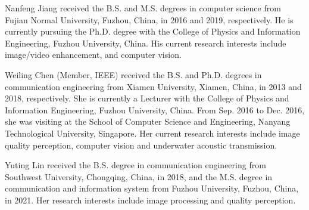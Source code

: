 \documentclass[journal]{IEEEtran}
\begin{document}
\begin{IEEEbiography}{Nanfeng Jiang} received the B.S. and M.S. degrees in computer science from Fujian Normal University, Fuzhou, China, in 2016 and 2019, respectively. He is currently pursuing the Ph.D. degree with the College of Physics and Information Engineering, Fuzhou University, China. His current research interests include image/video enhancement, and computer vision.
\end{IEEEbiography}
\vspace{-2 mm} 
\begin{IEEEbiography}{Weiling Chen} (Member, IEEE) received the B.S. and Ph.D. degrees in communication engineering from Xiamen University, Xiamen, China, in 2013 and 2018, respectively. She is currently a Lecturer with the College of Physics and Information Engineering, Fuzhou University, China. From Sep. 2016 to Dec. 2016, she was visiting at the School of Computer Science and Engineering, Nanyang Technological University, Singapore. Her current research interests include image quality perception, computer vision and underwater acoustic transmission.
\end{IEEEbiography}
\vspace{-2 mm} 
\begin{IEEEbiography}{Yuting Lin} received the B.S. degree in communication engineering from Southwest University, Chongqing, China, in 2018, and the M.S. degree in communication and information system from Fuzhou University, Fuzhou, China, in 2021.
Her research interests include image processing and quality perception.
\end{IEEEbiography}
\end{document}
